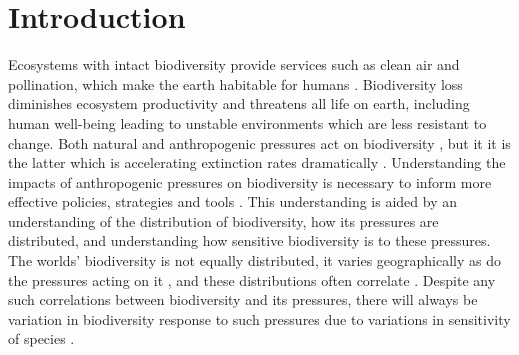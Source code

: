 \documentclass[11pt, a4paper, titlepage]{article}
\begin{document}
\newpage
\tableofcontents
\newpage
	
    \section*{Introduction}
    	
Ecosystems with intact biodiversity provide services such as clean air and pollination, which make the earth habitable for humans \citep{leemans2003millennium}. Biodiversity loss diminishes ecosystem productivity \citep{duffy2017biodiversity} and threatens all life on earth, including human well-being \citep{diaz2006biodiversity} leading to unstable environments which are less resistant to change. Both natural and anthropogenic pressures act on biodiversity \citep{nobel2020anthropogenic}, but it it is the latter which is accelerating extinction rates dramatically \citep{ceballos2015accelerated}. Understanding the impacts of anthropogenic pressures on biodiversity is necessary to inform more effective policies, strategies and tools \citep{diaz2006biodiversity}. This understanding is aided by an understanding of the  distribution of biodiversity, how its pressures are distributed, and understanding how sensitive biodiversity is to these pressures. The worlds' biodiversity is not equally distributed, it varies geographically \citep{gaston2000global, ricklefs2004comprehensive, mcrae2017diversity}  as do the pressures acting on it \citep{millennium2005ecosystems, sala2000global, bowler2020mapping}, and these distributions often correlate \citep{ament2019compatibility, Velde2022}. Despite any such correlations between biodiversity and its pressures, there will always be variation in biodiversity response to such pressures due to variations in sensitivity of species \citep{bowler2020mapping}. \newline
   	
\end{document}
